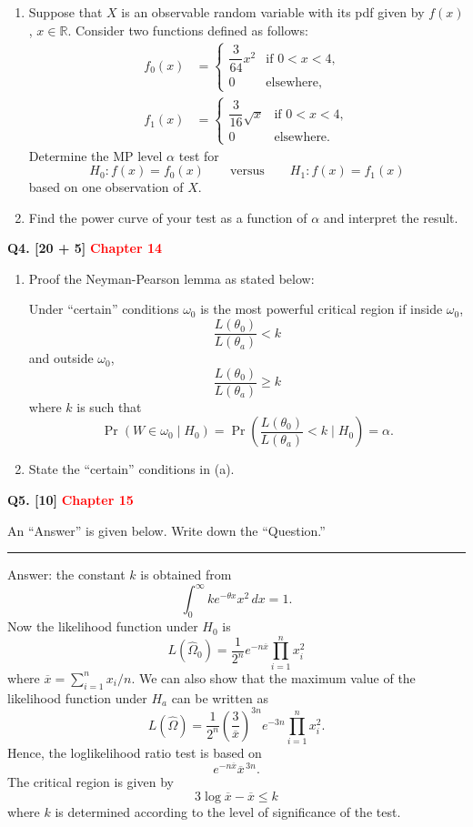 \documentclass[11pt]{article}
\begin{document}
\begin{enumerate}
\setlength{\itemsep}{8pt}\setlength{\parsep}{0pt}\setlength{\topsep}{3pt}
\item[(a)] Suppose that $X$ is an observable random variable with its pdf given by $f(x)$, $x\in\mathbb{R}$. Consider two functions defined as follows:
\[
\begin{aligned}
f_0(x)&=\begin{cases}
\dfrac{3}{64}x^2 & \text{if }0<x<4,\\
0 & \text{elsewhere},
\end{cases}\\[7pt]
f_1(x)&=\begin{cases}
\dfrac{3}{16}\sqrt{x} & \text{if }0<x<4,\\
0 & \text{elsewhere}.
\end{cases}
\end{aligned}
\]
Determine the MP level $\alpha$ test for
\[
H_0:f(x)=f_0(x)\qquad\text{versus}\qquad H_1:f(x)=f_1(x)
\]
based on one observation of $X$.
\item[(b)] Find the power curve of your test as a function of $\alpha$ and interpret the result.
\end{enumerate}

\bigskip
\textbf{Q4. [20 + 5]}  \textbf{\textcolor{red}{Chapter 14}} 

\begin{enumerate}
\setlength{\itemsep}{8pt}\setlength{\parsep}{0pt}\setlength{\topsep}{3pt}
\item[(a)] Proof the Neyman-Pearson lemma as stated below:

Under ``certain'' conditions $\omega_0$ is the most powerful critical region if inside $\omega_0$,
\[
\frac{L(\theta_0)}{L(\theta_a)}<k
\]
and outside $\omega_0$,
\[
\frac{L(\theta_0)}{L(\theta_a)}\geq k
\]
where $k$ is such that
\[
\Pr(W\in\omega_0\mid H_0)
=\Pr\!\left(\frac{L(\theta_0)}{L(\theta_a)}<k\mid H_0\right)=\alpha.
\]
\item[(b)] State the ``certain'' conditions in (a).
\end{enumerate}

\bigskip
\textbf{Q5. [10]}  \textbf{\textcolor{red}{Chapter 15}}

An ``Answer'' is given below. Write down the ``Question.''

\medskip
\hrule
\medskip

Answer: the constant $k$ is obtained from
\[
\int_0^\infty k e^{-\theta x}x^2\,dx=1.
\]
Now the likelihood function under $H_0$ is
\[
L(\widehat{\Omega}_0)=\frac{1}{2^n}e^{-n\overline{x}}\prod_{i=1}^n x_i^2
\]
where $\overline{x}=\sum_{i=1}^n x_i/n$. We can also show that the maximum value of the likelihood function under $H_a$ can be written as
\[
L(\widehat{\Omega})=\frac{1}{2^n}\left(\frac{3}{\overline{x}}\right)^{3n}e^{-3n}\prod_{i=1}^n x_i^2.
\]
Hence, the loglikelihood ratio test is based on
\[
e^{-n\overline{x}}\overline{x}^{\,3n}.
\]
The critical region is given by
\[
3\log\overline{x}-\overline{x}\leq k
\]
where $k$ is determined according to the level of significance of the test.
\end{document}

